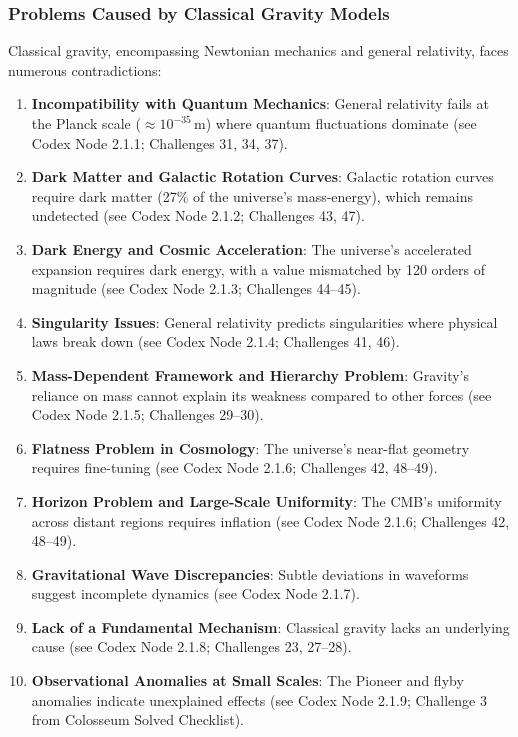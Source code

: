 \subsubsection{Problems Caused by Classical Gravity Models}
Classical gravity, encompassing Newtonian mechanics and general relativity, faces numerous contradictions:
\begin{enumerate}
    \item \textbf{Incompatibility with Quantum Mechanics}: General relativity fails at the Planck scale (\( \approx 10^{-35} \, \text{m} \)) where quantum fluctuations dominate (see Codex Node 2.1.1; Challenges 31, 34, 37).
    \item \textbf{Dark Matter and Galactic Rotation Curves}: Galactic rotation curves require dark matter (27\% of the universe’s mass-energy), which remains undetected (see Codex Node 2.1.2; Challenges 43, 47).
    \item \textbf{Dark Energy and Cosmic Acceleration}: The universe’s accelerated expansion requires dark energy, with a value mismatched by 120 orders of magnitude (see Codex Node 2.1.3; Challenges 44–45).
    \item \textbf{Singularity Issues}: General relativity predicts singularities where physical laws break down (see Codex Node 2.1.4; Challenges 41, 46).
    \item \textbf{Mass-Dependent Framework and Hierarchy Problem}: Gravity’s reliance on mass cannot explain its weakness compared to other forces (see Codex Node 2.1.5; Challenges 29–30).
    \item \textbf{Flatness Problem in Cosmology}: The universe’s near-flat geometry requires fine-tuning (see Codex Node 2.1.6; Challenges 42, 48–49).
    \item \textbf{Horizon Problem and Large-Scale Uniformity}: The CMB’s uniformity across distant regions requires inflation (see Codex Node 2.1.6; Challenges 42, 48–49).
    \item \textbf{Gravitational Wave Discrepancies}: Subtle deviations in waveforms suggest incomplete dynamics (see Codex Node 2.1.7).
    \item \textbf{Lack of a Fundamental Mechanism}: Classical gravity lacks an underlying cause (see Codex Node 2.1.8; Challenges 23, 27–28).
    \item \textbf{Observational Anomalies at Small Scales}: The Pioneer and flyby anomalies indicate unexplained effects (see Codex Node 2.1.9; Challenge 3 from Colosseum Solved Checklist).
\end{enumerate}

